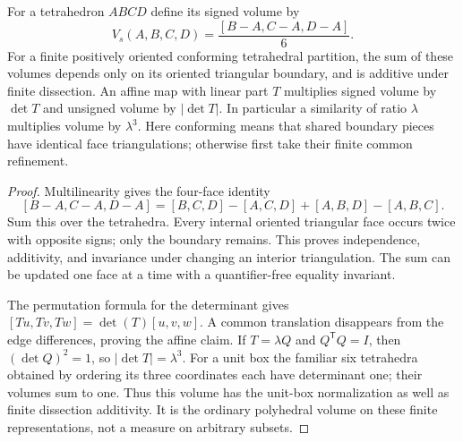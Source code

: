 \begin{theorem}
\label{sol:volume}
For a tetrahedron $ABCD$ define its signed volume by
\[
 V_s(A,B,C,D)=\frac{[B-A,C-A,D-A]}6.
\]
For a finite positively oriented conforming tetrahedral partition, the sum of these
volumes depends only on its oriented triangular boundary, and is additive
under finite dissection. An affine map with linear part $T$ multiplies
signed volume by $\det T$ and unsigned volume by $|\det T|$.
In particular a similarity of ratio $\lambda$ multiplies volume by
$\lambda^3$.
Here conforming means that shared boundary pieces have identical face
triangulations; otherwise first take their finite common refinement.
\end{theorem}
\begin{proof}
Multilinearity gives the four-face identity
\[
 [B-A,C-A,D-A]=[B,C,D]-[A,C,D]+[A,B,D]-[A,B,C].
\]
Sum this over the tetrahedra. Every internal oriented triangular face
occurs twice with opposite signs; only the boundary remains. This proves
independence, additivity, and invariance under changing an interior
triangulation. The sum can be updated one face at a time with a
quantifier-free equality invariant.

The permutation formula for the determinant gives
$[Tu,Tv,Tw]=\det(T)[u,v,w]$. A common translation disappears from
the edge differences, proving the affine claim. If $T=\lambda Q$ and
$Q^\mathsf TQ=I$, then $(\det Q)^2=1$, so $|\det T|=\lambda^3$.
For a unit box the familiar six tetrahedra obtained by ordering its three
coordinates each have determinant one; their volumes sum to one.
Thus this volume has the unit-box normalization as well as finite
dissection additivity. It is the ordinary polyhedral volume on these
finite representations, not a measure on arbitrary subsets.
\end{proof}

